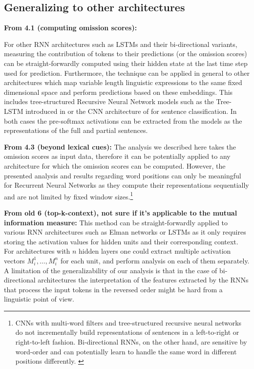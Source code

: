 \subsection{Generalizing to other architectures}

{\bf From 4.1 (computing omission scores):}

For other RNN architectures such as LSTMs \label{edit:omitgeneral}
and their bi-directional variants, measuring the contribution
of tokens to their predictions (or the omission scores)
can be straight-forwardly computed using their hidden state 
at the last time step used for prediction. Furthermore, the technique 
can be applied in general to other architectures which
map variable length linguistic expressions to the same fixed dimensional
space and perform predictions based on these embeddings. 
This includes tree-structured Recursive Neural Network models such as the Tree-LSTM
introduced in  or the CNN architecture of  
for sentence classification. In both cases the pre-softmax activations can be extracted 
from the models as the representations of the full and partial sentences.   

{\bf From 4.3 (beyond lexical cues):}
The analysis we described here takes
the omission scores as input data, therefore it can be potentially applied 
to any architecture for which the omission scores can be computed. However,
the presented analysis and results regarding word positions can only be meaningful
for Recurrent Neural Networks as they compute their representations sequentially and are not
limited by fixed window sizes.\footnote{CNNs with multi-word filters
and tree-structured recursive neural networks do not incrementally build representations
of sentences in a left-to-right or right-to-left fashion. 
Bi-directional RNNs, on the other hand, are sensitive by word-order and can potentially
learn to handle the same word in different positions differently. \label{edit:foot}}

{\bf From old 6 (top-k-context), not sure if it's applicable to the mutual information measure:}
This method can be straight-forwardly applied to various 
RNN architectures such as Elman networks or LSTMs 
as it only requires storing the activation values for hidden units and 
their corresponding context. For architectures with $n$ hidden layers
one could extract multiple activation vectors $M_i^{1}, \ldots, M_i^{n}$
for each unit, and perform analysis on each of them separately.
A limitation of the generalizability of our analysis is that in the case of 
bi-directional architectures the interpretation of the features
extracted by the RNNs that process the input tokens in the reversed order
might be hard from a linguistic point of view. 

